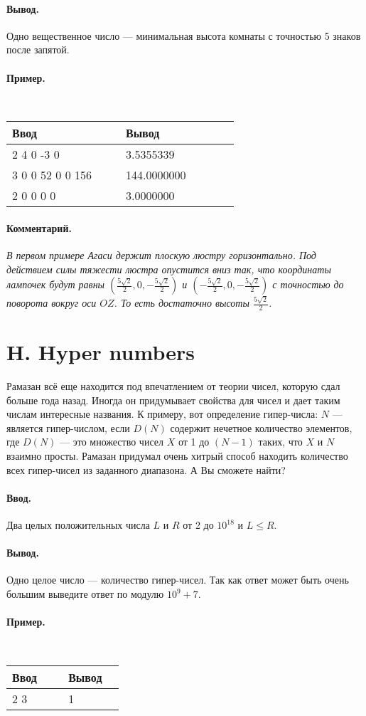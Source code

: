 \documentclass[10pt, a5paper]{article}
\newcommand{\informat}[1]
{
	\paragraph{Ввод.\\} #1
}
\newcommand{\outformat}[1]
{
	\paragraph{Вывод.\\} #1
}
\newcommand{\example}[2]
{
	\paragraph{Пример.\\}
	{\tt
	\begin{tabular}{|p{0.4\linewidth}|p{0.4\linewidth}|}
	\hline
	Ввод & Вывод \\
	\hline
	#1 & #2		\\
	\hline
	\end{tabular}
	}
}
\newcommand{\exampleee}[6]
{
	\paragraph{Пример.\\}
	{\tt
	\begin{tabular}{|p{0.4\linewidth}|p{0.4\linewidth}|}
	\hline
	Ввод 	& Вывод  	\\
	\hline
	#1 		& #2 		\\
	\hline
	#3		& #4		\\
	\hline
	#5		& #6		\\
	\hline
	\end{tabular}
	}
}
\newcommand{\excomm}[1]
{
	\paragraph{Комментарий. \\}
	\textit{#1}
}
\begin{document}
\outformat{Одно вещественное число --- минимальная высота комнаты с точностью 5 знаков после запятой.}

\exampleee{
2 \newline
3 4 0 \newline
4 -3 0
}
{3.5355339}
{3 \newline
39 0 0 \newline
0 52 0 \newline
0 0 156
}
{144.0000000}
{2 \newline
1 0 0 \newline
-2 0 0
}
{3.0000000}

\excomm{В первом примере Агаси держит плоскую люстру горизонтально. Под действием силы тяжести люстра опустится вниз так, что координаты лампочек будут равны $\left(\frac{5 \sqrt{2}}{2}, 0, -\frac{5 \sqrt{2}}{2} \right)$ и $\left(-\frac{5 \sqrt{2}}{2}, 0, -\frac{5 \sqrt{2}}{2} \right)$ с точностью до поворота вокруг оси $OZ$. То есть достаточно высоты $\frac{5 \sqrt{2}}{2}$.}






\section*{H. Hyper numbers}
 

Рамазан всё еще находится под впечатлением от теории чисел, которую сдал больше года назад. Иногда он придумывает свойства для чисел и дает таким числам интересные названия. К примеру, вот определение гипер-числа: $N$ --- является гипер-числом, если $D(N)$ содержит нечетное количество элементов, где $D(N)$ --- это множество чисел $X$ от 1 до $(N-1)$ таких, что $X$ и $N$ взаимно просты. Рамазан придумал очень хитрый способ находить количество всех гипер-чисел из заданного диапазона. А Вы сможете найти?

\informat{Два целых положительных числа $L$ и $R$ от 2 до $10^{18}$ и $L \leqslant R$.}

\outformat{Одно целое число --- количество гипер-чисел. Так как ответ может быть очень большим выведите ответ по модулю $10^9+7$.}

\example{2 3}{1}
\end{document}
